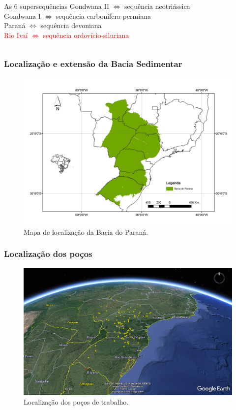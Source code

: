 \documentclass[10pt]{beamer} %
\begin{document}
\begin{frame}
\begin{columns}
\begin{column}{0.75\textwidth}
\begin{block}{As $6$ supersequências}
				Gondwana II $\Longleftrightarrow$ sequência neotriássica \\
				Gondwana I $\Longleftrightarrow$ sequência carbonífera-permiana\\ 
				Paraná $\Longleftrightarrow$ sequência devoniana\\
				\textcolor{red}{Rio Ivaí $\Longleftrightarrow$ sequência ordovício-siluriana}\\
				\cite{Vail_1977,assine_1994,milani_orogenias_1998}
			\end{block}
		\end{column}
	\end{columns}
\end{frame}


\begin{frame}
	\frametitle{Localização e extensão da Bacia Sedimentar}
	\begin{figure}[H]
		\centering
			\includegraphics[scale=0.3]{Imagens/BaciaParana.jpg}
		\caption{Mapa de localização da Bacia do Paraná. }
		\label{mapa geologico}
	\end{figure}
\end{frame}

\begin{frame}
	\frametitle{Localização dos poços}
	\begin{figure}[H]
		\centering
		\includegraphics[scale=0.25]{Imagens/Pocos2.png}
		\caption{Localização dos poços de trabalho.}
		\label{real}
	\end{figure}
\end{frame}
\end{document}
